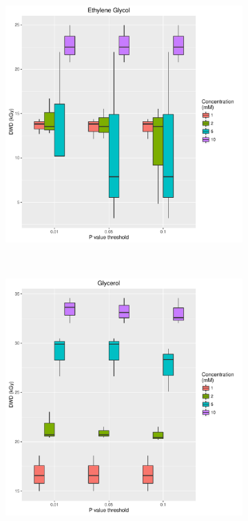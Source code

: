 \begin{figure}
\begin{subfigure}[b]{0.75\textwidth}
            \caption{}
            \label{}
    \end{subfigure}
\end{figure}
\begin{figure}
    \centering
    \begin{subfigure}[b]{0.75\textwidth}
            \centering
            \includegraphics[width=\textwidth]{figures/saxs/Ethylene_Glycol_PThresh_comp.pdf}
            \caption{}
            \label{}
    \end{subfigure}
    \\
    \begin{subfigure}[b]{0.75\textwidth}
            \centering
            \includegraphics[width=\textwidth]{figures/saxs/Glycerol_PThresh_comp.pdf}

\end{subfigure}
\end{figure}

